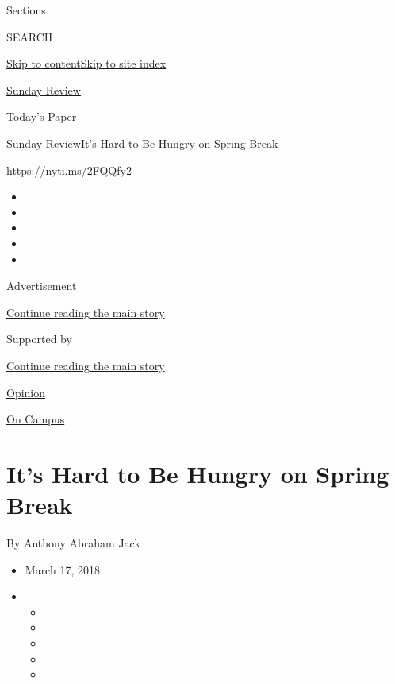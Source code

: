 Sections

SEARCH

\protect\hyperlink{site-content}{Skip to
content}\protect\hyperlink{site-index}{Skip to site index}

\href{https://www.nytimes3xbfgragh.onion/section/opinion/sunday}{Sunday
Review}

\href{https://myaccount.nytimes3xbfgragh.onion/auth/login?response_type=cookie\&client_id=vi}{}

\href{https://www.nytimes3xbfgragh.onion/section/todayspaper}{Today's
Paper}

\href{/section/opinion/sunday}{Sunday Review}\textbar{}It's Hard to Be
Hungry on Spring Break

\url{https://nyti.ms/2FQQfy2}

\begin{itemize}
\item
\item
\item
\item
\item
\end{itemize}

Advertisement

\protect\hyperlink{after-top}{Continue reading the main story}

Supported by

\protect\hyperlink{after-sponsor}{Continue reading the main story}

\href{/section/opinion}{Opinion}

\href{/column/on-campus}{On Campus}

\hypertarget{its-hard-to-be-hungry-on-spring-break}{%
\section{It's Hard to Be Hungry on Spring
Break}\label{its-hard-to-be-hungry-on-spring-break}}

By Anthony Abraham Jack

\begin{itemize}
\item
  March 17, 2018
\item
  \begin{itemize}
  \item
  \item
  \item
  \item
  \item
  \end{itemize}
\end{itemize}

